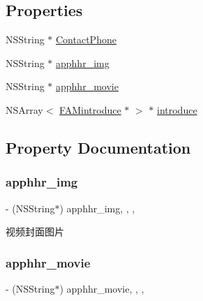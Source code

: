\subsection*{Properties}
\begin{DoxyCompactItemize}
\item 
N\+S\+String $\ast$ \mbox{\hyperlink{interface_f_n_partner_apply_model_a76f8242b0cca34b0b28f8ad669cb4487}{Contact\+Phone}}
\item 
N\+S\+String $\ast$ \mbox{\hyperlink{interface_f_n_partner_apply_model_a6ff29f7363d4111e7e9e44c5a01c6a7a}{apphhr\+\_\+img}}
\item 
N\+S\+String $\ast$ \mbox{\hyperlink{interface_f_n_partner_apply_model_abd75089fdbcc7944eab06f8478b3d90b}{apphhr\+\_\+movie}}
\item 
N\+S\+Array$<$ \mbox{\hyperlink{interface_f_a_mintroduce}{F\+A\+Mintroduce}} $\ast$ $>$ $\ast$ \mbox{\hyperlink{interface_f_n_partner_apply_model_a0cc8d0216a8f3d231e33f25157ca0e82}{introduce}}
\end{DoxyCompactItemize}


\subsection{Property Documentation}
\mbox{\label{interface_f_n_partner_apply_model_a6ff29f7363d4111e7e9e44c5a01c6a7a}} 
\subsubsection{\texorpdfstring{apphhr\+\_\+img}{apphhr\_img}}
{\footnotesize\ttfamily -\/ (N\+S\+String$\ast$) apphhr\+\_\+img\hspace{0.3cm}{\ttfamily [read]}, {\ttfamily [write]}, {\ttfamily [nonatomic]}, {\ttfamily [copy]}}

视频封面图片 \mbox{\label{interface_f_n_partner_apply_model_abd75089fdbcc7944eab06f8478b3d90b}} 
\subsubsection{\texorpdfstring{apphhr\+\_\+movie}{apphhr\_movie}}
{\footnotesize\ttfamily -\/ (N\+S\+String$\ast$) apphhr\+\_\+movie\hspace{0.3cm}{\ttfamily [read]}, {\ttfamily [write]}, {\ttfamily [nonatomic]}, {\ttfamily [copy]}}

